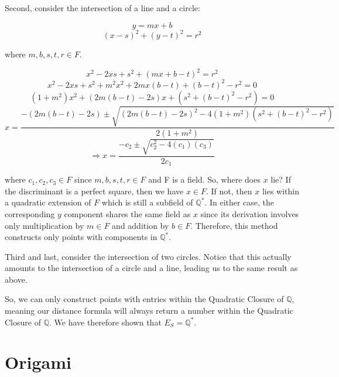 \documentclass[]{article}
\begin{document}
  Second, consider the intersection of a line and a circle:
  
  \[y=mx+b\]
  \[(x-s)^2 + (y-t)^2 = r^2\]
  
  where $m,b,s,t,r \in F$.
  
  \[x^2-2xs+s^2+(mx+b-t)^2=r^2\]
  \[x^2-2xs+s^2+m^2x^2+2mx(b-t)+(b-t)^2-r^2=0\]
  \[(1+m^2)x^2+(2m(b-t)-2s)x+(s^2+(b-t)^2-r^2)=0\]
  \[x=\frac{-(2m(b-t)-2s)\pm \sqrt{(2m(b-t)-2s)^2-4(1+m^2)(s^2+(b-t)^2-r^2)}}{2(1+m^2)}\]
  \[\Rightarrow x=\frac{-c_2 \pm \sqrt{c_2^2-4(c_1)(c_3)}}{2c_1}\]
  
  where $c_1,c_2,c_3 \in F$ since $m,b,s,t,r \in F$ and F is a field. So, where does $x$ lie? If the discriminant is a perfect square, then we have $x \in F$. If not, then $x$ lies within a quadratic extension of $F$ which is still a subfield of $\mathbb{Q}^*$. In either case, the corresponding $y$ component shares the same field as $x$ since its derivation involves only multiplication by $m \in F$ and addition by $b \in F$. Therefore, this method constructs only points with components in $\mathbb{Q}^*$.
  
  Third and last, consider the intersection of two circles. Notice that this actually amounts to the intersection of a circle and a line, leading us to the same result as above.
  
  So, we can only construct points with entries within the Quadratic Closure of $\mathbb{Q}$, meaning our distance formula will always return a number within the Quadratic Closure of $\mathbb{Q}$. We have therefore shown that $E_S = \mathbb{Q}^*$.
  
  \section{Origami}
\end{document}
